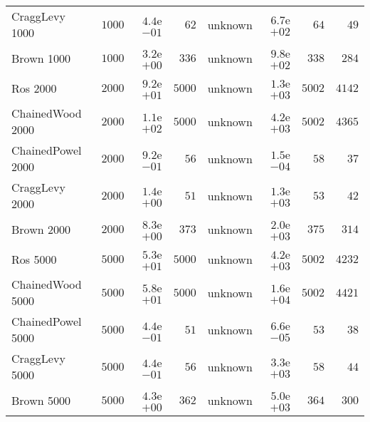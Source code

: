 \begin{longtable}[c]{lrrrrrrr}
CraggLevy 1000 & \( 1000\) & \( 4.4\)e\(-01\) & \(   62\) & unknown & \( 6.7\)e\(+02\) & \(   64\) & \(   49\) \\
Brown 1000 & \( 1000\) & \( 3.2\)e\(+00\) & \(  336\) & unknown & \( 9.8\)e\(+02\) & \(  338\) & \(  284\) \\
Ros 2000 & \( 2000\) & \( 9.2\)e\(+01\) & \( 5000\) & unknown & \( 1.3\)e\(+03\) & \( 5002\) & \( 4142\) \\
ChainedWood 2000 & \( 2000\) & \( 1.1\)e\(+02\) & \( 5000\) & unknown & \( 4.2\)e\(+03\) & \( 5002\) & \( 4365\) \\
ChainedPowel 2000 & \( 2000\) & \( 9.2\)e\(-01\) & \(   56\) & unknown & \( 1.5\)e\(-04\) & \(   58\) & \(   37\) \\
CraggLevy 2000 & \( 2000\) & \( 1.4\)e\(+00\) & \(   51\) & unknown & \( 1.3\)e\(+03\) & \(   53\) & \(   42\) \\
Brown 2000 & \( 2000\) & \( 8.3\)e\(+00\) & \(  373\) & unknown & \( 2.0\)e\(+03\) & \(  375\) & \(  314\) \\
Ros 5000 & \( 5000\) & \( 5.3\)e\(+01\) & \( 5000\) & unknown & \( 4.2\)e\(+03\) & \( 5002\) & \( 4232\) \\
ChainedWood 5000 & \( 5000\) & \( 5.8\)e\(+01\) & \( 5000\) & unknown & \( 1.6\)e\(+04\) & \( 5002\) & \( 4421\) \\
ChainedPowel 5000 & \( 5000\) & \( 4.4\)e\(-01\) & \(   51\) & unknown & \( 6.6\)e\(-05\) & \(   53\) & \(   38\) \\
CraggLevy 5000 & \( 5000\) & \( 4.4\)e\(-01\) & \(   56\) & unknown & \( 3.3\)e\(+03\) & \(   58\) & \(   44\) \\
Brown 5000 & \( 5000\) & \( 4.3\)e\(+00\) & \(  362\) & unknown & \( 5.0\)e\(+03\) & \(  364\) & \(  300\) \\
\hline 
\end{longtable}
